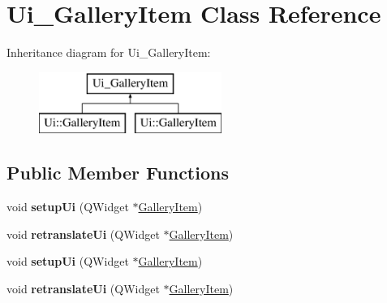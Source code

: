 \hypertarget{class_ui___gallery_item}{}\section{Ui\+\_\+\+Gallery\+Item Class Reference}
\label{class_ui___gallery_item}
Inheritance diagram for Ui\+\_\+\+Gallery\+Item\+:\begin{figure}[H]
\begin{center}
\leavevmode
\includegraphics[height=2.000000cm]{class_ui___gallery_item}
\end{center}
\end{figure}
\subsection*{Public Member Functions}
\begin{DoxyCompactItemize}
\item 
\mbox{\label{class_ui___gallery_item_a65f4b32878f4f30dc30144f27c63683a}} 
void {\bfseries setup\+Ui} (Q\+Widget $\ast$\hyperlink{class_gallery_item}{Gallery\+Item})
\item 
\mbox{\label{class_ui___gallery_item_ae6f04a5fe50b2093692e87ddd984f001}} 
void {\bfseries retranslate\+Ui} (Q\+Widget $\ast$\hyperlink{class_gallery_item}{Gallery\+Item})
\item 
\mbox{\label{class_ui___gallery_item_a65f4b32878f4f30dc30144f27c63683a}} 
void {\bfseries setup\+Ui} (Q\+Widget $\ast$\hyperlink{class_gallery_item}{Gallery\+Item})
\item 
\mbox{\label{class_ui___gallery_item_ae6f04a5fe50b2093692e87ddd984f001}} 
void {\bfseries retranslate\+Ui} (Q\+Widget $\ast$\hyperlink{class_gallery_item}{Gallery\+Item})
\end{DoxyCompactItemize}
